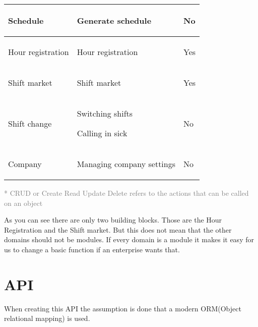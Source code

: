\begin{tabularx}{\linewidth}{|>{}X|>{}X|>{}X|}
    Schedule
     &
    \begin{compactitem}
        \item Generate schedule
    \end{compactitem}
    &
    No
    \\ \hline

    Hour registration
     &
    \begin{compactitem}
        \item Hour registration
    \end{compactitem}
    &
    Yes
    \\ \hline

    Shift market
     &
    \begin{compactitem}
        \item Shift market
    \end{compactitem}
    &
    Yes
    \\ \hline

    Shift change
     &
    \begin{compactitem}
        \item Switching shifts
        \item Calling in sick
    \end{compactitem}
    &
    No
    \\ \hline

    Company
     &
    \begin{compactitem}
        \item Managing company settings
    \end{compactitem}
    &
    No
    \\ \hline
\end{tabularx}

\small{\textcolor{gray}{* CRUD or Create Read Update Delete refers to the actions that can be called on an object}}

As you can see there are only two building blocks. Those are the Hour Registration and the Shift market. But this does not mean that the other domains should not be modules. If every domain is a module it makes it easy for us to change a basic function if an enterprise wants that.

\section{API}
\label{sec:API}

When creating this API the assumption is done that a modern ORM(Object relational mapping) is used. 

